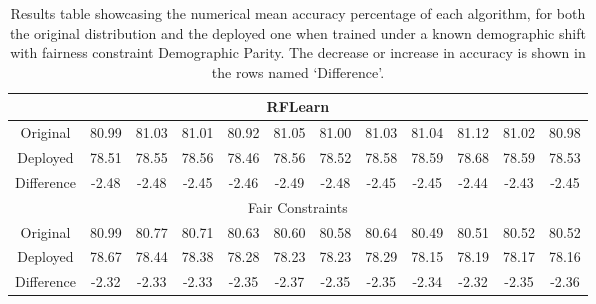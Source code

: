 \begin{table}[ht]
\begin{tabular}{|c|ccccccccccc|}
\multicolumn{12}{|c|}{RFLearn} \\ \hline
Original & 80.99 & 81.03 & 81.01 & 80.92 & 81.05 & 81.00 & 81.03 & 81.04 & 81.12 & 81.02 & 80.98 \\ \hline
Deployed & 78.51 & 78.55 & 78.56 & 78.46 & 78.56 & 78.52 & 78.58 & 78.59 & 78.68 & 78.59 & 78.53 \\ \hline Difference & -2.48 & -2.48 & -2.45 & -2.46 & -2.49 & -2.48 & -2.45 & -2.45 & -2.44 & -2.43 & -2.45 \\ \hline

\multicolumn{12}{|c|}{Fair Constraints} \\ \hline
Original & 80.99 & 80.77 & 80.71 & 80.63 & 80.60 & 80.58 & 80.64 & 80.49 & 80.51 & 80.52 & 80.52 \\ \hline
Deployed & 78.67 & 78.44 & 78.38 & 78.28 & 78.23 & 78.23 & 78.29 & 78.15 & 78.19 & 78.17 & 78.16 \\ \hline
Difference & -2.32 & -2.33 & -2.33 & -2.35 & -2.37 & -2.35 & -2.35 & -2.34 & -2.32 & -2.35 & -2.36 \\ \hline 
\end{tabular}
\caption{Results table showcasing the numerical mean accuracy percentage of each algorithm, for both the original distribution and the deployed one when trained under a known demographic shift with fairness constraint Demographic Parity. The decrease or increase in accuracy is shown in the rows named `Difference'.}
\label{tab:uci_num_k_DP}
\end{table}

